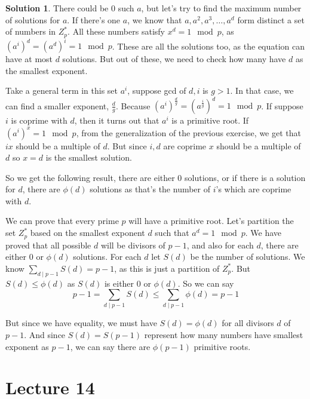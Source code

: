 \documentclass[a4paper,10pt]{article}
\theoremstyle{definition} %
\newtheorem*{solution}{Solution}
\begin{document}
    \begin{solution}
        There could be $0$ such $a$, but let's try to find the maximum number of solutions
        for $a$. If there's one $a$, we know that $a, a^2, a^3, \dots, a^d$ form distinct
        a set of numbers in $Z_p^*$. All these numbers satisfy $x^d = 1 \mod p$, as ${(a^i)}^d
        = {(a^d)}^i = 1 \mod p$. These are all the solutions too, as the equation can have at
        most $d$ solutions. But out of these, we need to check how many have $d$ as the smallest
        exponent.

        Take a general term in this set $a^i$, suppose gcd of $d, i$ is  $g > 1$. In that case, we
        can find a smaller exponent, $\frac{d}{g}$. Because ${(a^i)}^{\frac{d}{g}} = 
        {(a^{\frac{i}{g}})}^d = 1 \mod p$. If suppose $i$ is coprime with $d$, then it turns out 
        that $a^i$ is a primitive root. If ${(a^i)}^x = 1 \mod p$, from the generalization of the 
        previous exercise, we get that $ix$ should be a multiple of $d$. But since $i,d$ are coprime
        $x$ should be a multiple of $d$ so $x = d$ is the smallest solution.

        So we get the following result, there are either 0 solutions, or if there is a solution for 
        $d$, there are $\phi(d)$ solutions as that's the number of $i$'s which are coprime with $d$.
    \end{solution}

    We can prove that every prime $p$ will have a primitive root. Let's partition the set
    $Z_p^*$ based on the smallest exponent $d$ such that $a^d = 1 \mod p$. We have proved that 
    all possible $d$ will be divisors of $p-1$, and also for each $d$, there are either $0$
    or $\phi(d)$ solutions. For each $d$ let $S(d)$ be the number of solutions. We know
    $\sum_{d \mid p-1} S(d) = p-1$, as this is just a partition of $Z_p^*$. But $S(d) \leq \phi(d)$
    as $S(d)$ is either $0$ or $\phi(d)$. So we can say 
    \[ p-1 = \sum_{d \mid p-1} S(d) \leq \sum_{d \mid p-1} \phi(d) = p-1 \]

    But since we have equality, we must have $S(d) = \phi(d)$ for all divisors $d$ of 
    $p-1$. And since $S(d) = S(p-1)$ represent how many numbers have smallest exponent
    as $p-1$, we can say there are $\phi(p-1)$ primitive roots. 

    \section{Lecture 14}
\end{document}
